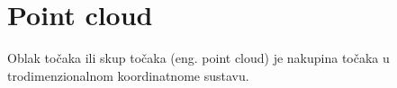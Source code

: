 \section{Point cloud}

Oblak točaka ili skup točaka (eng. point cloud) je nakupina točaka u trodimenzionalnom koordinatnome sustavu.